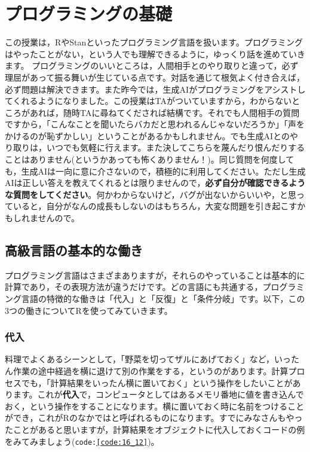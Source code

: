 \documentclass{ltjsbook}
\begin{document}
\chapter{プログラミングの基礎}
\label{x17_Programming2}
この授業は，RやStanといったプログラミング言語を扱います。プログラミングはやったことがない，という人でも理解できるように，ゆっくり話を進めていきます。
プログラミングのいいところは，人間相手とのやり取りと違って，必ず理屈があって振る舞いが生じている点です。対話を通じて根気よく付き合えば，必ず問題は解決できます。また昨今では，生成AIがプログラミングをアシストしてくれるようになりました。この授業はTAがついていますから，わからないところがあれば，随時TAに尋ねてくだされば結構です。それでも人間相手の質問ですから，「こんなことを聞いたらバカだと思われるんじゃないだろうか」「声をかけるのが恥ずかしい」ということがあるかもしれません。でも生成AIとのやり取りは，いつでも気軽に行えます。また決してこちらを蔑んだり恨んだりすることはありません(というかあっても怖くありません！)。同じ質問を何度しても，生成AIは一向に意に介さないので，積極的に利用してください。ただし生成AIは正しい答えを教えてくれるとは限りませんので，\textbf{必ず自分が確認できるような質問をしてください}。何かわからないけど，バグが出ないからいいや，と思っていると，自分がなんの成長もしないのはもちろん，大変な問題を引き起こすかもしれませんので。


\section{高級言語の基本的な働き}
プログラミング言語はさまざまありますが，それらのやっていることは基本的に計算であり，その表現方法が違うだけです。どの言語にも共通する，プログラミング言語の特徴的な働きは「代入」と「反復」と「条件分岐」です。以下，この3つの働きについてRを使ってみていきます。
\subsection{代入}
料理でよくあるシーンとして，「野菜を切ってザルにあげておく」など，いったん作業の途中経過を横に退けて別の作業をする，というのがあります。計算プロセスでも，「計算結果をいったん横に置いておく」という操作をしたいことがあります。これが\textbf{代入}で，コンピュータとしてはあるメモリ番地に値を書き込んでおく，という操作をすることになります。横に置いておく時に名前をつけることができ，これがRのなかではと呼ばれるものになります。すでにみなさんもやったことがあると思いますが，計算結果をオブジェクトに代入しておくコードの例をみてみましょう(\texttt{code:\ref{code:16_12}})。
\end{document}
